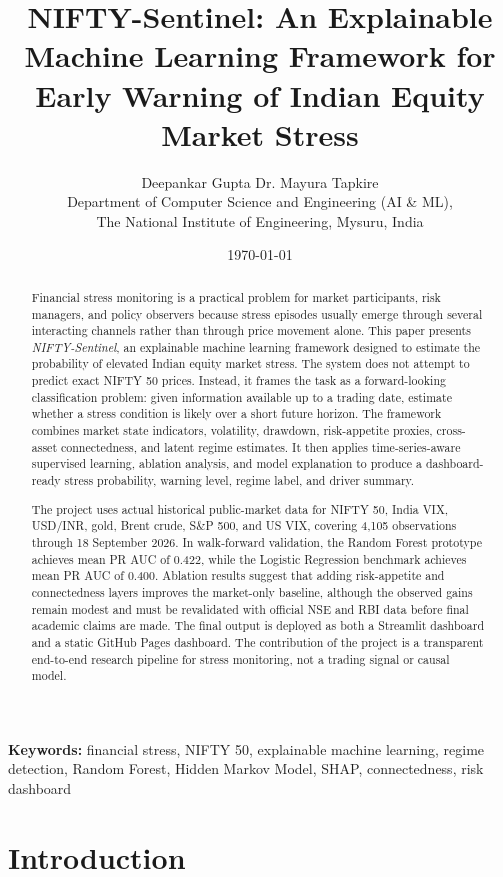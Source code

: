 \documentclass[12pt,a4paper]{article}
\title{\textbf{NIFTY-Sentinel: An Explainable Machine Learning Framework for Early Warning of Indian Equity Market Stress}}
\author{Deepankar Gupta \quad Dr. Mayura Tapkire\\
Department of Computer Science and Engineering (AI \& ML),\\
The National Institute of Engineering, Mysuru, India}
\date{\today}
\begin{document}
\maketitle

\begin{abstract}
Financial stress monitoring is a practical problem for market participants, risk managers, and policy observers because stress episodes usually emerge through several interacting channels rather than through price movement alone. This paper presents \textit{NIFTY-Sentinel}, an explainable machine learning framework designed to estimate the probability of elevated Indian equity market stress. The system does not attempt to predict exact NIFTY 50 prices. Instead, it frames the task as a forward-looking classification problem: given information available up to a trading date, estimate whether a stress condition is likely over a short future horizon. The framework combines market state indicators, volatility, drawdown, risk-appetite proxies, cross-asset connectedness, and latent regime estimates. It then applies time-series-aware supervised learning, ablation analysis, and model explanation to produce a dashboard-ready stress probability, warning level, regime label, and driver summary.

The project uses actual historical public-market data for NIFTY 50, India VIX, USD/INR, gold, Brent crude, S\&P 500, and US VIX, covering 4,105 observations through 18 September 2026. In walk-forward validation, the Random Forest prototype achieves mean PR AUC of 0.422, while the Logistic Regression benchmark achieves mean PR AUC of 0.400. Ablation results suggest that adding risk-appetite and connectedness layers improves the market-only baseline, although the observed gains remain modest and must be revalidated with official NSE and RBI data before final academic claims are made. The final output is deployed as both a Streamlit dashboard and a static GitHub Pages dashboard. The contribution of the project is a transparent end-to-end research pipeline for stress monitoring, not a trading signal or causal model.
\end{abstract}

\textbf{Keywords:} financial stress, NIFTY 50, explainable machine learning, regime detection, Random Forest, Hidden Markov Model, SHAP, connectedness, risk dashboard

\section{Introduction}
\end{document}
